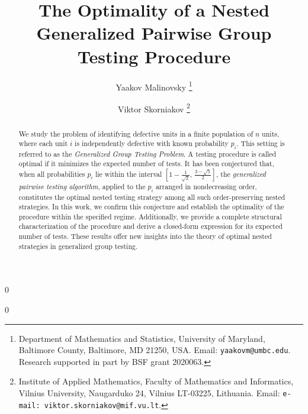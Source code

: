 \documentclass[12pt]{article}
\newcommand{\blind}{0}
\begin{document}
%

\def\spacingset#1{\renewcommand{\baselinestretch}%
{#1}\small\normalsize} \spacingset{1}



\blind
{\title{\bf The Optimality of a Nested Generalized Pairwise Group Testing Procedure}

\author{Yaakov Malinovsky
\thanks{Department of Mathematics and Statistics, University of Maryland,
Baltimore County, Baltimore, MD 21250, USA.
Email: {\tt yaakovm@umbc.edu}.  Research supported in part
by BSF grant 2020063.}
\and
Viktor Skorniakov
\thanks{Institute of Applied Mathematics, Faculty of Mathematics and Informatics,
Vilnius University, Naugarduko 24, Vilnius LT-03225, Lithuania.
Email: {\tt e-mail: viktor.skorniakov@mif.vu.lt}.  }
}
 \maketitle
} \fi
{}\blind
{
  \bigskip
  \bigskip
  \bigskip
  \begin{center}
    {\LARGE\bf }
\end{center}
  \medskip
} \fi

\bigskip
\begin{abstract}
We study the problem of identifying defective units in a finite population of \( n \) units, where each unit \( i \) is independently defective with known probability \( p_i \). This setting is referred to as the \emph{Generalized Group Testing Problem}. A testing procedure is called optimal if it minimizes the expected number of tests.
It has been conjectured that, when all probabilities \( p_i \) lie within the interval \( \left[1 - \frac{1}{\sqrt{2}},\, \frac{3 - \sqrt{5}}{2} \right] \), the \emph{generalized pairwise testing {algorithm}}, applied to the \( p_i \) arranged in nondecreasing order, constitutes the optimal nested testing strategy among all such order-preserving nested strategies.
In this work, we confirm this conjecture and establish the optimality of the procedure within the specified regime. Additionally, we provide a complete structural characterization of the procedure and derive a closed-form expression for its expected number of tests. These results offer new insights into the theory of optimal nested strategies in generalized group testing.
\end{abstract}
\end{document}

